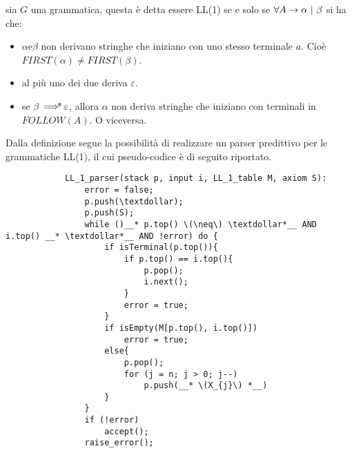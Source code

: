 \documentclass{subfiles}
\begin{document}
\begin{Definition*}
    sia \(G\) una grammatica, questa è detta essere LL(1) se e solo se \(\forall \Grammar{A}{\alpha}[\beta]\) si ha che:
    \begin{itemize}
        \item \(\alpha \text{e} \beta\) non derivano stringhe che iniziano con uno stesso terminale \(a\).
              Cioè \(FIRST(\alpha) \neq FIRST(\beta)\).
        \item al più uno dei due deriva \(\varepsilon\).
        \item se \(\beta \operatorname{\implies\hspace{-7.5pt}*} \varepsilon\), allora \(\alpha\) non deriva stringhe che iniziano con terminali in \(FOLLOW(A)\). O viceversa.
    \end{itemize}
\end{Definition*}
\begin{Algorithm*}
    Dalla definizione segue la possibilità di realizzare un parser predittivo per le grammatiche LL(1), il cui pseudo-codice è di seguito riportato.
    \begin{center}
        \begin{lstlisting}
            LL_1_parser(stack p, input i, LL_1_table M, axiom S):
                error = false;
                p.push(\textdollar);
                p.push(S);
                while ()__* p.top() \(\neq\) \textdollar*__ AND i.top() __* \textdollar*__ AND !error) do {
                    if isTerminal(p.top()){
                        if p.top() == i.top(){
                            p.pop();
                            i.next();
                        }
                        error = true;
                    }
                    if isEmpty(M[p.top(), i.top()])
                        error = true;
                    else{
                        p.pop();
                        for (j = n; j > 0; j--)
                            p.push(__* \(X_{j}\) *__)
                    }
                }
                if (!error)
                    accept();
                raise_error();
        \end{lstlisting}
    \end{center}
\end{Algorithm*}
\end{document}
